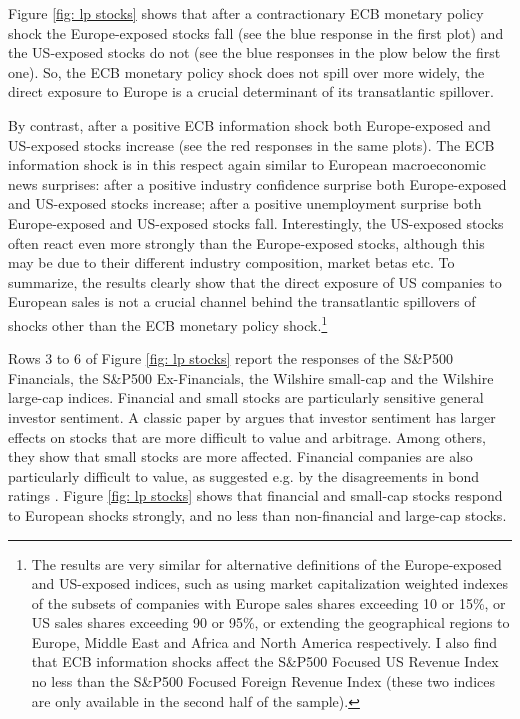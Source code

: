 \documentclass[a4paper,12pt]{article}
\begin{document}
Figure \ref{fig: lp stocks} shows that after a contractionary ECB monetary policy shock the Europe-exposed stocks fall (see the blue response in the first plot) and the US-exposed stocks do not (see the blue responses in the plow below the first one). So, the ECB monetary policy shock does not spill over more widely, the direct exposure to Europe is a crucial determinant of its transatlantic spillover.

By contrast, after a positive ECB information shock both Europe-exposed and US-exposed stocks increase (see the red responses in the same plots).
The ECB information shock is in this respect again similar to European macroeconomic news surprises:
after a positive industry confidence surprise both Europe-exposed and US-exposed stocks increase;
after a positive unemployment surprise both Europe-exposed and US-exposed stocks fall.
Interestingly, the US-exposed stocks often react even more strongly than the Europe-exposed stocks,
although this may be due to their different industry composition, market betas etc.
To summarize, the results clearly show that the direct exposure of US companies to European sales is not a crucial channel behind the transatlantic spillovers of shocks other than the ECB monetary policy shock.\footnote{The results
are very similar for alternative definitions of the Europe-exposed and US-exposed indices, such as
using market capitalization weighted indexes of the subsets of companies with Europe sales shares exceeding 10 or 15\%, or US sales shares exceeding 90 or 95\%, or extending the geographical regions to Europe, Middle East and Africa and North America respectively. I also find that ECB information shocks affect the S\&P500 Focused US Revenue Index no less than
the S\&P500 Focused Foreign Revenue Index (these two indices are only available in the second half of the sample).}

Rows 3 to 6 of Figure \ref{fig: lp stocks} report the responses of
the S\&P500 Financials, the S\&P500 Ex-Financials, the Wilshire small-cap and the Wilshire large-cap indices.
Financial and small stocks are particularly sensitive general investor sentiment.
A classic paper by \cite{Baker_Wurgler_2006} argues that investor sentiment has larger effects on stocks that are more difficult to value and arbitrage. Among others, they show that small stocks are more affected. Financial companies are also particularly difficult to value, as suggested e.g. by the
disagreements in bond ratings \citep{Morgan_2002}.
Figure \ref{fig: lp stocks} shows that financial and small-cap stocks respond to European shocks strongly, and no less than non-financial and large-cap stocks.
\end{document}
